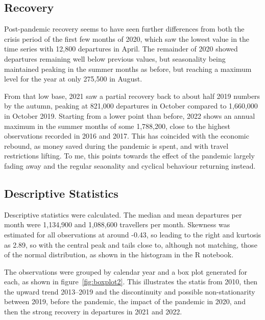 \documentclass[9pt,technote]{IEEEtran}
\begin{document}
\subsection{Recovery}

Post-pandemic recovery seems to have seen further differences from both the crisis period of the first few months of 2020, which saw the lowest value in the time series with 12,800 departures in April.  The remainder of 2020 showed departures remaining well below previous values, but seasonality being maintained peaking in the summer months as before, but reaching a maximum level for the year at only 275,500 in August.  

From that low base, 2021 saw a partial recovery back to about half 2019 numbers by the autumn, peaking at 821,000 departures in October compared to 1,660,000 in October 2019.  Starting from a lower point than before, 2022 shows an annual maximum in the summer months of some 1,788,200, close to the highest observations recorded in 2016 and 2017.  This has coincided with the economic rebound, as money saved during the pandemic is spent, and with travel restrictions lifting.  To me, this points towards the effect of the pandemic largely fading away and the regular seaonality and cyclical behaviour returning instead.  

\subsection{Descriptive Statistics}

Descriptive statistics were calculated.  The median and mean departures per month were 1,134,900 and 1,088,600 travellers per month.  Skewness was estimated for all observations at around -0.43, so leading to the right and kurtosis as 2.89, so with the central peak and tails close to, although not matching, those of the normal distribution, as shown in the histogram in the R notebook.  

The observations were grouped by calendar year and a box plot generated for each, as shown in figure~\ref{fig:boxplot2}.  This illustrates the statis from 2010, then the upward trend 2013--2019 and the discontinuity and possible non-stationarity between 2019, before the pandemic, the impact of the pandemic in 2020, and then the strong recovery in departures in 2021 and 2022.    
\end{document}
